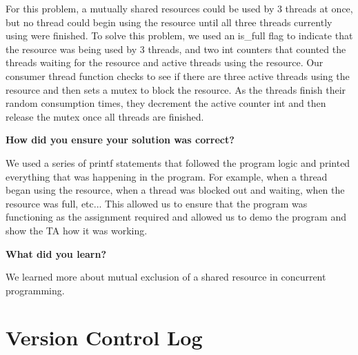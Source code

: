 \documentclass[10pt,letterpaper,draftclsnofoot,onecolumn]{IEEEtran}
\begin{document}
\noindent For this problem, a mutually shared resources could be used by 3 threads at once, but no thread could begin using the resource until all three threads currently using were finished. To solve this problem, we used an is\_full flag to indicate that the resource was being used by 3 threads, and two int counters that counted the threads waiting for the resource and active threads using the resource. Our consumer thread function checks to see if there are three active threads using the resource and then sets a mutex to block the resource. As the threads finish their random consumption times, they decrement the active counter int and then release the mutex once all threads are finished.\\

\bigskip

\noindent\textbf{How did you ensure your solution was correct?}
\medskip

\noindent We used a series of printf statements that followed the program logic and printed everything that was happening in the program. For example, when a thread began using the resource, when a thread was blocked out and waiting, when the resource was full, etc... This allowed us to ensure that the program was functioning as the assignment required and allowed us to demo the program and show the TA how it was working.\\ 
\bigskip

\noindent\textbf{What did you learn?}
\medskip

\noindent We learned more about mutual exclusion of a shared resource in concurrent programming.
\medskip

\section{Version Control Log}
\bigskip
\end{document}
